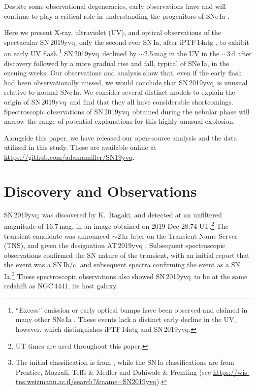 \documentclass[twocolumn]{aastex63}
\newcommand{\sn}{SN\,2019yvq}
\begin{document}
Despite some observational degeneracies, early observations have and will
continue to play a critical role in understanding the progenitors of SNe\,Ia
\citep[e.g., early photometry of SN\,2011fe constrained the size of the
exploding star to be $\lesssim 0.02$\,$R_\odot$, providing the most direct
evidence to date that SNe\,Ia come from WDs;][]{Bloom12a}.

Here we present X-ray, ultraviolet (UV), and optical observations of the
spectacular \sn, only the second ever SN\,Ia, after iPTF\,14atg \citep{Cao15},
to exhibit an early UV flash.\footnote{``Excess'' emission or early optical
bumps have been observed and claimed in many other SNe\,Ia
\citep[e.g.,][]{Marion16,Hosseinzadeh17,Shappee19,Dimitriadis19}. These events
lack a distinct early decline in the UV, however, which distinguishes
iPTF\,14atg and \sn.} \sn\ declined by $\sim$2.5\,mag in the UV in the
$\sim$3\,d after discovery followed by a more gradual rise and fall, typical
of SNe\,Ia, in the ensuing weeks. Our observations and analysis show that,
even if the early flash had been observationally missed, we would conclude
that \sn\ is unusual relative to normal SNe\,Ia. We consider several distinct
models to explain the origin of \sn\ and find that they all have considerable
shortcomings. Spectroscopic observations of \sn\ obtained during the nebular
phase will narrow the range of potential explanations for this highly unusual
explosion.

Alongside this paper, we have released our open-source analysis and the data
utilized in this study. These are available online at
\href{https://github.com/adamamiller/SN19yvq}{\url{https://github.com/adamamiller/SN19yvq}}.

\section{Discovery and Observations}\label{sec:obs}

\sn\ was discovered by K.~Itagaki, and detected at an unfiltered magnitude
of 16.7\,mag, in an image obtained on 2019 Dec 28.74 UT.\footnote{UT times
are used throughout this paper.} The transient candidate was announced
$\sim$2\,hr later on the Transient Name Server (TNS), and given the
designation AT\,2019yvq \citep{Itagaki19}. Subsequent spectroscopic
observations confirmed the SN nature of the transient, with an initial
report that the event was a SN\,Ib/c, and subsequent spectra confirming the
event as a SN\,Ia.\footnote{The initial classification is from
\citet{Kawabata20}, while the SN\,Ia classifications are from Prentice,
Mazzali, Teffs \& Medler and Dahiwale \& Fremling (see
\url{https://wis-tns.weizmann.ac.il/search?&name=SN2019yvq}).} These
spectroscopic observations also showed \sn\ to be at the same redshift as
NGC\,4441, its host galaxy.
\end{document}
